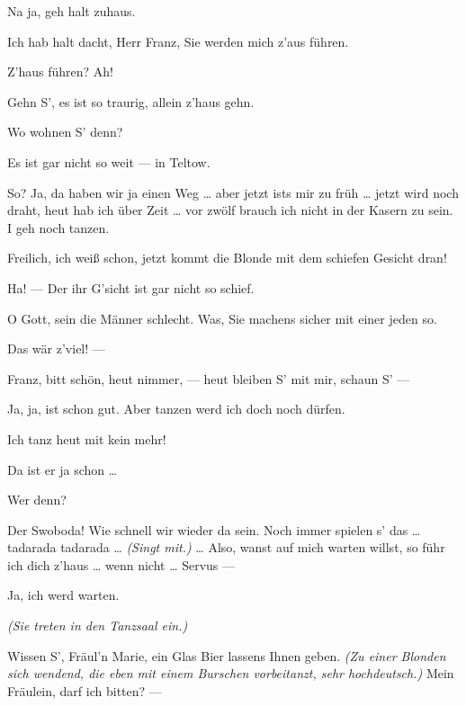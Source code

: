 \documentclass[
	final,
	a4paper,
	ngerman,
	mpinclude = true, %
	twoside = true,
	open = right,
	cleardoublepage = plain,
	DIV = 13,
	BCOR = 1cm,
	titlepage = firstiscover,
	]{scrbook}
\newcommand{\direction}[1]{\textit{(#1)}}
\newcommand{\thecharacter}[1]{\textup{\textsc{#1}}\xspace}
\newcommand{\thesoldat}{\thecharacter{Soldatin}}
\newcommand{\themaedchen}{\thecharacter{Praktikant}}
\newcommand{\character}[1]{\item[#1:]}
\newcommand{\soldat}{\character{\thesoldat}}
\newcommand{\maedchen}{\character{\themaedchen}}
\begin{document}
\begin{play}
	\soldat
	Na ja, geh halt zuhaus.

	\maedchen
	Ich hab halt dacht, Herr Franz, Sie werden mich z'aus führen.

	\soldat
	Z'haus führen? Ah!

	\maedchen
	Gehn S', es ist so traurig, allein z'haus gehn.

	\soldat
	Wo wohnen S' denn?

	\maedchen
	Es ist gar nicht so weit --- in Teltow.

	\soldat
	So? Ja, da haben wir ja einen Weg \ldots{} aber jetzt ists mir zu früh \ldots{} jetzt wird noch draht, heut hab ich über Zeit \ldots{} vor zwölf brauch ich nicht in der Kasern zu sein. I geh noch tanzen.

	\maedchen
	Freilich, ich weiß schon, jetzt kommt die Blonde mit dem schiefen Gesicht dran!

	\soldat
	Ha! --- Der ihr G'sicht ist gar nicht so schief.

	\maedchen
	O Gott, sein die Männer schlecht. Was, Sie machens sicher mit einer jeden so.

	\soldat
	Das wär z'viel! ---

	\maedchen
	Franz, bitt schön, heut nimmer, --- heut bleiben S' mit mir, schaun S' ---

	\soldat
	Ja, ja, ist schon gut. Aber tanzen werd ich doch noch dürfen.

	\maedchen
	Ich tanz heut mit kein mehr!

	\soldat
	Da ist er ja schon \ldots{}

	\maedchen
	Wer denn?

	\soldat
	Der Swoboda! Wie schnell wir wieder da sein. Noch immer spielen s' das \ldots{} tadarada tadarada \ldots{} \direction{Singt mit.} \ldots{} Also, wanst auf mich warten willst, so führ ich dich z'haus \ldots{} wenn nicht \ldots{} Servus ---

	\maedchen
	Ja, ich werd warten.

	\direction{Sie treten in den Tanzsaal ein.}

	\soldat
	Wissen S', Fräul'n Marie, ein Glas Bier lassens Ihnen geben. \direction{Zu einer Blonden sich wendend, die eben mit einem Burschen vorbeitanzt, sehr hochdeutsch.} Mein Fräulein, darf ich bitten? ---

\end{play}
\end{document}
